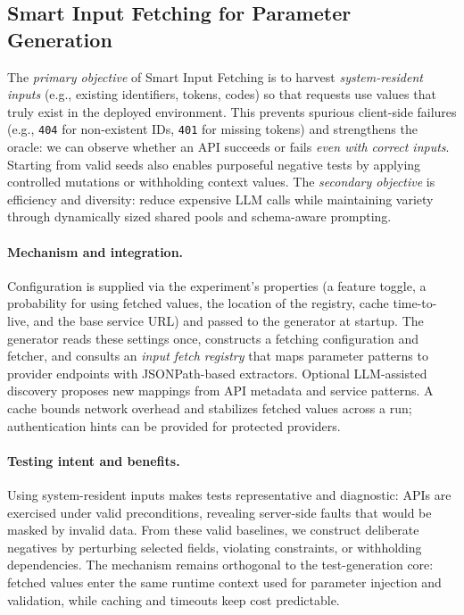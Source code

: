 \documentclass[conference]{IEEEtran}
\begin{document}
\subsection{Smart Input Fetching for Parameter Generation}\label{ssec:smartfetch}

The \emph{primary objective} of Smart Input Fetching is to harvest \emph{system-resident inputs} (e.g., existing identifiers, tokens, codes) so that requests use values that truly exist in the deployed environment. This prevents spurious client-side failures (e.g., \texttt{404} for non-existent IDs, \texttt{401} for missing tokens) and strengthens the oracle: we can observe whether an API succeeds or fails \emph{even with correct inputs}. Starting from valid seeds also enables purposeful negative tests by applying controlled mutations or withholding context values. The \emph{secondary objective} is efficiency and diversity: reduce expensive LLM calls while maintaining variety through dynamically sized shared pools and schema-aware prompting.

\paragraph{Mechanism and integration.}
Configuration is supplied via the experiment's properties (a feature toggle, a probability for using fetched values, the location of the registry, cache time-to-live, and the base service URL) and passed to the generator at startup. The generator reads these settings once, constructs a fetching configuration and fetcher, and consults an \emph{input fetch registry} that maps parameter patterns to provider endpoints with JSONPath-based extractors. Optional LLM-assisted discovery proposes new mappings from API metadata and service patterns. A cache bounds network overhead and stabilizes fetched values across a run; authentication hints can be provided for protected providers.


\paragraph{Testing intent and benefits.}
Using system-resident inputs makes tests representative and diagnostic: APIs are exercised under valid preconditions, revealing server-side faults that would be masked by invalid data. From these valid baselines, we construct deliberate negatives by perturbing selected fields, violating constraints, or withholding dependencies. The mechanism remains orthogonal to the test-generation core: fetched values enter the same runtime context used for parameter injection and validation, while caching and timeouts keep cost predictable.
\end{document}
